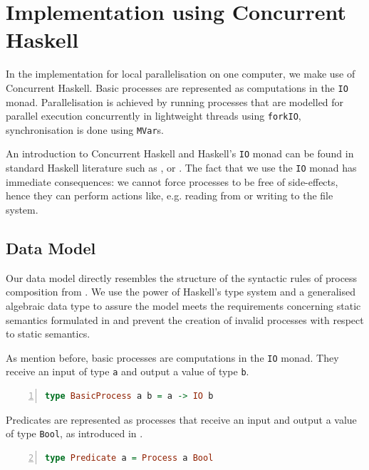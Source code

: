 \section{Implementation using Concurrent Haskell}
\label{chp:local}
In the implementation for local parallelisation on one computer, we make use of \textsf{Concurrent Haskell}. Basic processes are represented as computations in the \texttt{IO} monad. Parallelisation is achieved by running processes that are modelled for parallel execution concurrently in lightweight threads using \texttt{forkIO}, synchronisation is done using \texttt{MVar}s.

An introduction to \textsf{Concurrent Haskell} and \textsf{Haskell}'s \texttt{IO} monad can be found in standard \textsf{Haskell} literature such as \cite{Hutton}, \cite{Bird} or \cite{Marlow}. The fact that we use the \texttt{IO} monad has immediate consequences: we cannot force processes to be free of side-effects, hence they can perform actions like, e.g. reading from or writing to the file system.

\subsection{Data Model}
\label{chp:local_model}
Our data model directly resembles the structure of the syntactic rules of process composition from . We use the power of \textsf{Haskell}'s type system and a generalised algebraic data type to assure the model meets the requirements concerning static semantics formulated in  and prevent the creation of invalid processes with respect to static semantics.

As mention before, basic processes are computations in the \texttt{IO} monad. They receive an input of type \texttt{a} and output a value of type \texttt{b}.
\begin{lstlisting}[language=Haskell,caption=Representation of basic processes as computations in the \texttt{IO} monad.,label=fig:local_computation,numbers=left,frame=bt]
type BasicProcess a b = a -> IO b
\end{lstlisting}

Predicates are represented as processes that receive an input and output a value of type \texttt{Bool}, as introduced in .
\begin{lstlisting}[language=Haskell,caption=Representation of predicates as processes.,label=fig:local_computation,numbers=left,frame=bt,firstnumber=2]
type Predicate a = Process a Bool
\end{lstlisting}

